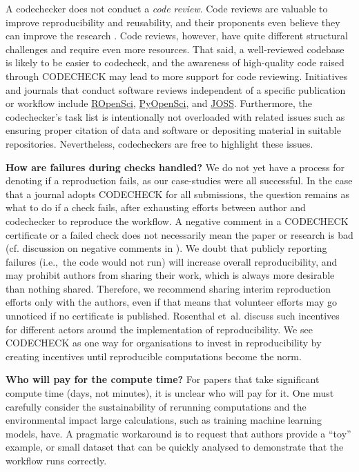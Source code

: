 \documentclass[12pt]{article}
\begin{document}
A codechecker does not conduct a \emph{code review}. Code reviews are
valuable to improve reproducibility and reusability, and their
proponents even believe they can improve the research
\cite{petre_code_2014}.  Code reviews, however, have quite different
structural challenges and require even more resources. That said, a
well-reviewed codebase is likely to be easier to codecheck, and the
awareness of high-quality code raised through CODECHECK may lead to
more support for code reviewing.  Initiatives and journals that
conduct software reviews independent of a specific publication or
workflow include \href{https://ropensci.org/}{ROpenSci}, \href{https://www.pyopensci.org/}{PyOpenSci}, and \href{https://joss.theoj.org}{JOSS}.  Furthermore, the codechecker's task
list is intentionally not overloaded with related issues such as
ensuring proper citation of data and software or depositing material
in suitable repositories. Nevertheless, codecheckers are free to
highlight these issues.

\textbf{How are failures during checks handled?} We do not yet have a process for denoting if a reproduction fails, as our case-studies were all successful.  In the case that a journal
adopts CODECHECK for all submissions, the question remains as what to
do if a check fails, after exhausting efforts between author and
codechecker to reproduce the workflow.  A negative comment in a
CODECHECK certificate or a failed check does not necessarily mean the
paper or research is bad (cf. discussion on negative comments in
\cite{everythinghertz123}).  We doubt that publicly reporting failures
(i.e.,~the code would not run) will increase overall reproducibility,
and may prohibit authors from sharing their work, which is always more
desirable than nothing shared. Therefore, we recommend sharing interim
reproduction efforts only with the authors, even if that means that volunteer
efforts may go unnoticed if no certificate is published.  
Rosenthal et~al. \cite{Rosenthal2016b} discuss such incentives for
different actors around the implementation of reproducibility. We see
CODECHECK as one way for organisations to invest in reproducibility by
creating incentives until reproducible computations become the norm.

\textbf{Who will pay for the compute time?}  For papers that take
significant compute time (days, not minutes), it is unclear who will
pay for it. One must carefully consider the sustainability of
rerunning computations and the environmental impact large
calculations, such as training machine learning models, have.  A
pragmatic workaround is to request that authors provide a ``toy''
example, or small dataset that can be quickly analysed to demonstrate
that the workflow runs correctly.
\end{document}
